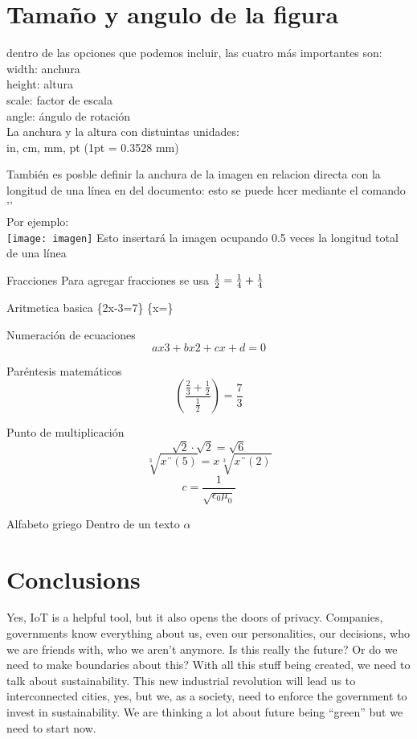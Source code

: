 \documentclass{IEEEtran}
\begin{document}
\section{Tamaño y angulo de la figura}
dentro de las opciones que podemos incluir, las cuatro más importantes son:\\
width: anchura\\
height: altura\\
scale: factor de escala\\
angle: ángulo de rotación\\
La anchura y la altura con distuintas unidades:\\
in, cm, mm, pt (1pt = 0.3528 mm)

También es posble definir la anchura de la imagen en relacion directa con la longitud de una línea en del documento: esto se puede hcer mediante el comando '\linewidth'\\
Por ejemplo:\\
\texttt{[image: imagen]}
Esto insertará la imagen ocupando 0.5 veces la longitud total de una línea

Fracciones
Para agregar fracciones se usa 
\begin{math}
    \frac{1}{2}=\frac{1}{4}+\frac{1}{4}\\
\end{math}

Aritmetica basica
\{2x-3=7\}
\{x=\}

Numeración de ecuaciones
\begin{equation}
    ax3+bx2+cx+d=0
\end{equation}

Paréntesis matemáticos
\[
\left(\frac{\frac{2}{3}+\frac{1}{2}}{\frac{1}{2}}\right)=\frac{7}{3}
\]

Punto de multiplicación
\[
\sqrt{2}\cdot\sqrt{2}=\sqrt{6}
\]
\[
\sqrt[3]{x¨(5)}=x\sqrt[3]{x¨(2)}
\]
\[
c=\frac{1}{\sqrt{\epsilon_{0}\mu_{0}}}
\]

Alfabeto griego
Dentro de un texto $\alpha$


\section{Conclusions} 

Yes, IoT is a helpful tool, but it also opens the doors of privacy. Companies, governments know everything about us, even our personalities, our decisions, who we are friends with, who we aren’t anymore. Is this really the future? Or do we need to make boundaries about this? With all this stuff being created, we need to talk about sustainability. This new industrial revolution will lead us to interconnected cities, yes, but we, as a society, need to enforce the government to invest in sustainability. We are thinking a lot about
future being “green” but we need to start now.
\end{document}
